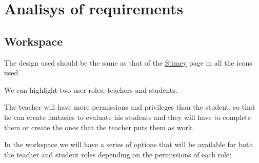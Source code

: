 \chapter{Analisys of requirements}
\section{Workspace}
The design used should be the same as that of the \href{https://stimey.eu/home}{Stimey} page in all the icons used.


We can highlight two user roles: teachers and students.


The teacher will have more permissions and privileges than the student, so that he can create fantasies to evaluate his students and they will have to complete them or create the ones that the teacher puts them as work.


In the workspace we will have a series of options that will be available for both the teacher and student roles depending on the permissions of each role:

